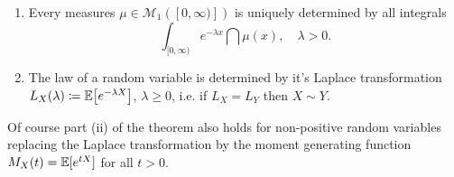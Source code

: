 \begin{lsuperwichtigersatz}
\begin{theorem}\label{cor_distributions_1}
	\begin{enumerate}[label=(\roman*)]
		\item Every measures $\mu \in \mathcal M_1([0,\infty)])$ is uniquely determined by all integrals $$\int_{[0,\infty)} e^{-\lambda x}\dint \mu(x),\quad \lambda>0.$$
		\item The law of a \underline{} random variable is determined by it's Laplace transformation $L_X(\lambda) \coloneqq \mathbb{E} \big[ e^{- \lambda X} \big]$, $\lambda \geq 0$, i.e. if $L_X=L_Y$ then $X\sim Y$.
	\end{enumerate}
\end{theorem}
\end{lsuperwichtigersatz}
Of course part (ii) of the theorem also holds for non-positive random variables replacing the Laplace transformation by the moment generating function $M_X(t)=\mathbb{E}[e^{tX}]$ for all $t>0$.
